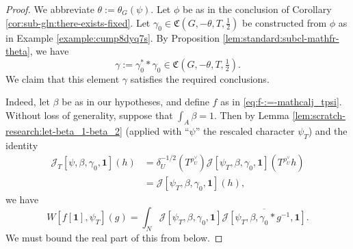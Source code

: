 \begin{proof}
  We abbreviate $\theta := \theta_G(\psi)$.  Let $\phi$ be as in the conclusion of Corollary \ref{cor:sub-gln:there-exists-fixed}.  Let $\gamma_0 \in \mathfrak{C}(G, - \theta, T, \tfrac{1}{2})$ be constructed from $\phi$ as in Example \ref{example:cump8dyq7s}.  By Proposition \ref{lem:standard:subcl-mathfr-theta}, we have
  \begin{equation*}
    \gamma := \gamma_0^* \ast \gamma_0 \in \mathfrak{C}(G,-\theta,T,\tfrac{1}{2}).
  \end{equation*}
  We claim that this element $\gamma$ satisfies the required conclusions.

  Indeed, let $\beta$ be as in our hypotheses, and define $f$ as in \eqref{eq:f-:=-mathcalj_tpsi}.  Without loss of generality, suppose that $\int_{A} \beta = 1$.  Then by Lemma \ref{lem:scratch-research:let-beta_1-beta_2} (applied with ``$\psi$'' the rescaled character $\psi_T$) and the identity
  \begin{align*}
    \mathcal{J}_T[\psi,\beta,\gamma_0,\mathbf{1}](h)
    &=
      \delta_U^{-1/2} (T^{\rho_U^\vee}) \mathcal{J}[\psi_T,\beta,\gamma_0, \mathbf{1}](T^{\rho_U^\vee} h)
    \\
    &=
      \mathcal{J}[\psi_T,\beta,\gamma_0,\mathbf{1}](h),
  \end{align*}
  we have
  \begin{equation}\label{eq:whittaker-evaluate-at-1-via-integral-distributions-convolved-appl}
    W[f[\mathbf{1}], \psi_T](g) = \int_N \mathcal{J}[\psi_T, \beta, \gamma_0,\mathbf{1}] \overline{\mathcal{J}[\psi_T, \beta, \gamma_0 \ast g^{-1},\mathbf{1}]}.
  \end{equation}
  We must bound the real part of this from below.


\end{proof}
